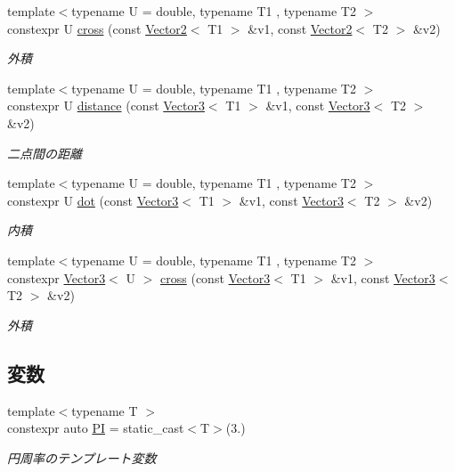 \begin{DoxyCompactItemize}
{\footnotesize template$<$typename U  = double, typename T1 , typename T2 $>$ }\\constexpr U \mbox{\hyperlink{namespacesaki_ab3e7c6abdd4377486e393407283a492b}{cross}} (const \mbox{\hyperlink{classsaki_1_1_vector2}{Vector2}}$<$ T1 $>$ \&v1, const \mbox{\hyperlink{classsaki_1_1_vector2}{Vector2}}$<$ T2 $>$ \&v2)
\begin{DoxyCompactList}\small\item\em 外積 \end{DoxyCompactList}\item 
{\footnotesize template$<$typename U  = double, typename T1 , typename T2 $>$ }\\constexpr U \mbox{\hyperlink{namespacesaki_a3323489be4b8c440241c8c8dcd517210}{distance}} (const \mbox{\hyperlink{classsaki_1_1_vector3}{Vector3}}$<$ T1 $>$ \&v1, const \mbox{\hyperlink{classsaki_1_1_vector3}{Vector3}}$<$ T2 $>$ \&v2)
\begin{DoxyCompactList}\small\item\em 二点間の距離 \end{DoxyCompactList}\item 
{\footnotesize template$<$typename U  = double, typename T1 , typename T2 $>$ }\\constexpr U \mbox{\hyperlink{namespacesaki_a4f2643c9bd618538a43cdad4a71398af}{dot}} (const \mbox{\hyperlink{classsaki_1_1_vector3}{Vector3}}$<$ T1 $>$ \&v1, const \mbox{\hyperlink{classsaki_1_1_vector3}{Vector3}}$<$ T2 $>$ \&v2)
\begin{DoxyCompactList}\small\item\em 内積 \end{DoxyCompactList}\item 
{\footnotesize template$<$typename U  = double, typename T1 , typename T2 $>$ }\\constexpr \mbox{\hyperlink{classsaki_1_1_vector3}{Vector3}}$<$ U $>$ \mbox{\hyperlink{namespacesaki_a0292208be2262a7ecbba114ebd10d5d6}{cross}} (const \mbox{\hyperlink{classsaki_1_1_vector3}{Vector3}}$<$ T1 $>$ \&v1, const \mbox{\hyperlink{classsaki_1_1_vector3}{Vector3}}$<$ T2 $>$ \&v2)
\begin{DoxyCompactList}\small\item\em 外積 \end{DoxyCompactList}\end{DoxyCompactItemize}
\subsection*{変数}
\begin{DoxyCompactItemize}
\item 
{\footnotesize template$<$typename T $>$ }\\constexpr auto \mbox{\hyperlink{namespacesaki_a1e4c737224df004cb65f178577838f0c}{PI}} = static\+\_\+cast$<$T$>$(3.)
\begin{DoxyCompactList}\small\item\em 円周率のテンプレート変数 \end{DoxyCompactList}\end{DoxyCompactItemize}


